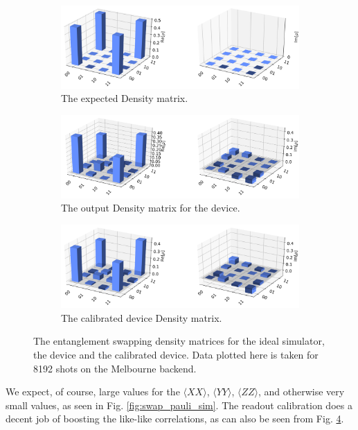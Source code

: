 \begin{figure}[h]
	\begin{subfigure}{.5\textwidth}
    \centering
		\includegraphics[width=.8\linewidth]{images/results/swap_density_sim.png}
		\caption{The expected Density matrix.}
		\label{fig:swap_density_sim}
	\end{subfigure} \newline
	\begin{subfigure}{.5\textwidth}
    \centering
		\includegraphics[width=.8\linewidth]{images/results/swap_density_dev.png}
		\caption{The output Density matrix for the device.}
		\label{fig:swap_density_dev}
	\end{subfigure} \newline
	\begin{subfigure}{.5\textwidth}
    \centering
		\includegraphics[width=.8\linewidth]{images/results/swap_density_cal.png}
		\caption{The calibrated device Density matrix.}
		\label{fig:swap_density_dev}
	\end{subfigure}
	\caption{The entanglement swapping density matrices for the ideal simulator,
    the device and the calibrated device. Data plotted here is taken for 8192 shots
    on the Melbourne backend. }
	\label{fig:swap_density}
\end{figure}

We expect, of course, large values for the $\langle XX \rangle$, $\langle YY
\rangle$, $\langle ZZ \rangle$, and otherwise very small values, as seen in Fig.
\ref{fig:swap_pauli_sim}. The readout calibration does a decent job of boosting
the like-like correlations, as can also be seen from Fig.
\ref{fig:swap_density}.

